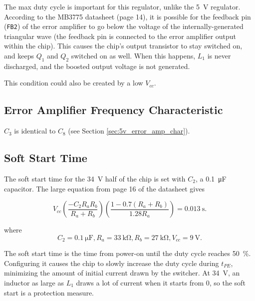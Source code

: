 \documentclass{article}
\newcommand{\Vcc}{$V_{cc}$}
\newcommand{\chippin}{\texttt}
\newcommand{\model}{\textsf}
\begin{document}


The max duty cycle is important for this regulator, unlike the
\qty{5}{\volt} regulator. According to the \model{MB3775} datasheet
(page 14), it is possible for the feedback pin (\chippin{FB2}) of the
error amplifier to go below the voltage of the internally-generated
triangular wave (the feedback pin is connected to the error amplifier
output within the chip). This causes the chip's output transistor to
stay switched on, and keeps $Q_1$ and $Q_2$ switched on as well. When
this happens, $L_1$ is never discharged, and the boosted output
voltage is not generated.

This condition could also be created by a low \Vcc{}.
\subsection{Error Amplifier Frequency Characteristic}
$C_3$ is identical to $C_8$ (see Section \ref{sec:5v_error_amp_char}).

\subsection{Soft Start Time}
\label{sec:soft_start_time}
The soft start time for the \qty{34}{\volt} half of the chip is set
with $C_2$, a \qty{0.1}{\micro\farad} capacitor. The large equation
from page 16 of the datasheet gives

\begin{displaymath}
  V_{cc}\left(\frac{-C_2R_aR_b}{R_a+R_b}\right)\left(\frac{1-0.7(R_a+R_b)}{1.28R_a}\right)
  = \qty{0.013}{\second}.
\end{displaymath}

\noindent
where
\begin{displaymath}
  C_2 = \qty{0.1}{\micro\farad},R_a =
  \qty{33}{\kilo\ohm},R_b=\qty{27}{\kilo\ohm},V_{cc} = \qty{9}{\volt}.
\end{displaymath}

The soft start time is the time from power-on until the duty cycle
reaches \qty{50}{\%}. Configuring it causes the chip to slowly
increase the duty cycle during $t_{PE}$, minimizing the amount of
initial current drawn by the switcher. At \qty{34}{\volt}, an inductor
as large as $L_1$ draws a lot of current when it starts from 0, so the
soft start is a protection measure.
\end{document}
